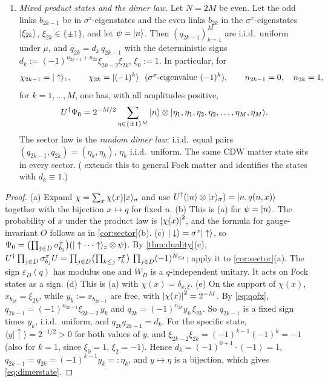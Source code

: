 \begin{lemma}
\begin{enumerate}[label=(\alph*)]
$q_j=(-1)^{n_j}\xi_{b_{j-1}}\xi_{b_j}$.
\item \emph{Mixed product states and the dimer law.}  Let $N=2M$ be even.  Let the odd links
$b_{2k-1}$ be in $\sigma^z$-eigenstates and the even links $b_{2k}$ in the $\sigma^x$-eigenstates
$|\xi_{2k}\rangle$, $\xi_{2k}\in\{\pm1\}$, and let $\psi=|n\rangle$.  Then $(q_{2k-1})_{k=1}^M$ are i.i.d.\ uniform
under $\mu$, and $q_{2k}=d_k\,q_{2k-1}$ with the deterministic signs
$d_k:=(-1)^{n_{2k-1}+n_{2k}}\xi_{2k-2}\xi_{2k}$, $\xi_0:=1$.  In particular, for
\[
  \chi_{2k-1}=|\uparrow\rangle_z,\qquad \chi_{2k}=|(-1)^k\rangle\ \ (\sigma^x\text{-eigenvalue }(-1)^k),\qquad
  n_{2k-1}=0,\quad n_{2k}=1,
\]
for $k=1,\dots,M$,
one has, with all amplitudes positive,
\begin{equation}\label{eq:dimerstate}
  U^\dagger\Psi_0=2^{-M/2}\sum_{\eta\in\{\pm1\}^M}|n\rangle\otimes|\eta_1,\eta_1,\eta_2,\eta_2,\dots,\eta_M,\eta_M\rangle.
\end{equation}
The sector law is the \emph{random dimer law}: i.i.d.\ equal pairs $(q_{2k-1},q_{2k})=(\eta_k,\eta_k)$,
$\eta_k$ i.i.d.\ uniform.  The same CDW matter state sits in every sector.  ( extends this
to general Fock matter and identifies the states with $d_k\equiv1$.)
\end{enumerate}
\end{lemma}

\begin{proof}
(a) Expand $\chi=\sum_x\chi(x)|x\rangle_\sigma$ and use $U^\dagger(|n\rangle\otimes|x\rangle_\sigma)=|n,q(n,x)\rangle$
together with the bijection $x\leftrightarrow q$ for fixed $n$.
(b) This is (a) for $\psi=|n\rangle$.  The probability of $x$ under the product law is
$\left|\chi(x)\right|^2$, and the formula for gauge-invariant $O$ follows as in \cref{cor:sector}(b).
(c) $|\downarrow\rangle=\sigma^x|\uparrow\rangle$, so $\Psi_0=\bigl(\prod_{j\in D}\sigma^{x}_{b_{j}}\bigr)(|\uparrow\cdots\uparrow\rangle_z\otimes\psi)$.
By \cref{thm:duality}(c),
$U^\dagger\prod_{j\in D}\sigma^{x}_{b_{j}}U=\prod_{j\in D}\bigl(\prod_{k\le j}\tau^{x}_{k}\bigr)\,\prod_{j\in D}(-1)^{N_{\le j}}$;
apply it to \cref{cor:sector}(a).  The sign $\varepsilon_D(q)$ has modulus one and $W_D$ is a $q$-independent
unitary.  It acts on Fock states as a sign.
(d) This is (a) with $\chi(x)=\delta_{x,\xi}$.
(e) On the support of $\chi(x)$, $x_{b_{2k}}=\xi_{2k}$, while $y_k:=x_{b_{2k-1}}$ are free, with
$\left|\chi(x)\right|^2=2^{-M}$.  By \eqref{eq:qofx}, $q_{2k-1}=(-1)^{n_{2k-1}}\xi_{2k-2}\,y_k$ and
$q_{2k}=(-1)^{n_{2k}}y_k\,\xi_{2k}$.  So $q_{2k-1}$ is a fixed sign times $y_k$, i.i.d.\ uniform, and
$q_{2k}q_{2k-1}=d_k$.  For the specific state, $\langle y|\uparrow\rangle=2^{-1/2}>0$ for both values of
$y$, and $\xi_{2k-2}\xi_{2k}=(-1)^{k-1}(-1)^k=-1$ (also for $k=1$, since $\xi_0=1$, $\xi_2=-1$).
Hence $d_k=(-1)^{0+1}\cdot(-1)=1$, $q_{2k-1}=q_{2k}=(-1)^{k-1}y_k=:\eta_k$, and $y\mapsto\eta$ is a
bijection, which gives \eqref{eq:dimerstate}.
\end{proof}

